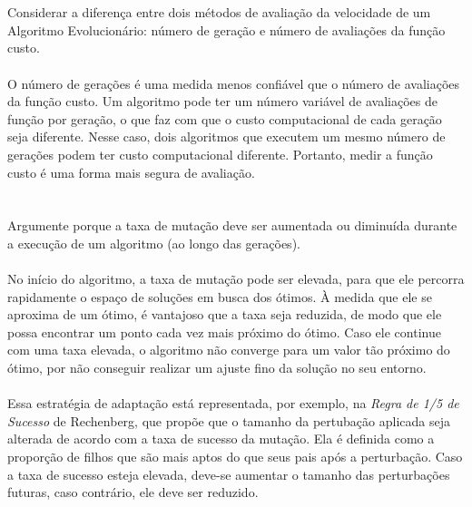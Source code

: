 \documentclass{article}
\begin{document}
\section{}

\paragraph{}\large{Considerar a diferença entre dois métodos de avaliação da velocidade de um Algoritmo Evolucionário: número de geração e número de avaliações da função custo.}
\paragraph{}O número de gerações é uma medida menos confiável que o número de avaliações da função custo. Um algoritmo pode ter um número variável de avaliações de função por geração, o que faz com que o custo computacional de cada geração seja diferente. Nesse caso, dois algoritmos que executem um mesmo número de gerações podem ter custo computacional diferente. Portanto, medir a função custo é uma forma mais segura de avaliação.

\section{}

\paragraph{}\large{Argumente porque a taxa de mutação deve ser aumentada ou diminuída durante a execução de um algoritmo (ao longo das gerações).}
\paragraph{}No início do algoritmo, a taxa de mutação pode ser elevada, para que ele percorra rapidamente o espaço de soluções em busca dos ótimos. À medida que ele se aproxima de um ótimo, é vantajoso que a taxa seja reduzida, de modo que ele possa encontrar um ponto cada vez mais próximo do ótimo. Caso ele continue com uma taxa elevada, o algoritmo não converge para um valor tão próximo do ótimo, por não conseguir realizar um ajuste fino da solução no seu entorno.

\paragraph{}Essa estratégia de adaptação está representada, por exemplo, na \textit{Regra de 1/5 de Sucesso} de Rechenberg, que propõe que o tamanho da pertubação aplicada seja alterada de acordo com a taxa de sucesso da mutação. Ela é definida como a proporção de filhos que são mais aptos do que seus pais após a perturbação. Caso a taxa de sucesso esteja elevada, deve-se aumentar o tamanho das perturbações futuras, caso contrário, ele deve ser reduzido.

\section{}
\end{document}

